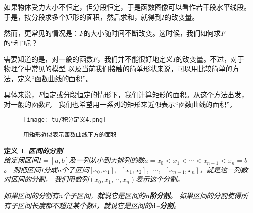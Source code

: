 \documentclass[12pt,UTF8]{ctexbook}
\newtheorem{df}{定义}[section]
\begin{document}
如果物体受力大小不恒定，但分段恒定，于是函数图像可以看作若干段水平线段。
于是，按分段求多个矩形的面积，然后求和，就得到$I$的改变量。

然而，更常见的情况是：$F$的大小随时间不断改变。这时候，我们如何求$F$的“和”呢？

需要知道的是，对一般的函数$F$，我们并不能很好地定义$I$的改变量。不过，对于物理学中常见的模型
以及当前我们接触的简单形状来说，可以用比较简单的方法，定义“函数曲线的面积”。

具体来说，$F$恒定或分段恒定的情形下，我们计算矩形的面积。从这个方法出发，对一般的函数$F$，
我们也希望用一系列的矩形来近似表示“函数曲线的面积”。

\begin{figure}[h] %
    \vspace{4pt}
    \centering
    \texttt{[image: tu/积分定义4.png]}
    \caption*{\texttt{用矩形近似表示函数曲线下方的面积}}
\end{figure}




\begin{df}{\textbf{区间的分割}}
    \mbox{} \\
    给定闭区间$I=[a, b]$及一列从小到大排列的数$a = x_0 < x_1 < \cdots < x_{n-1} < x_n = b$。
    则把区间$I$分成$n$个子区间$[x_0, x_1], \,\,\, [x_1, x_2], \,\,\,\cdots, \,\,\,[x_{n-1}, x_n]$，就是这一列数对区间的分割。
    我们用数列$(x_0, x_1, \cdots, x_n)$表示这个分割。

    如果区间的分割有$n$个子区间，就说它是区间的$\boldsymbol{n}$\textbf{阶分割}。
    如果区间的分割使得所有子区间长度都不超过某个数$d$，就说它是区间的$\boldsymbol{d}$\textbf{–分割}。

\end{df}
\end{document}
